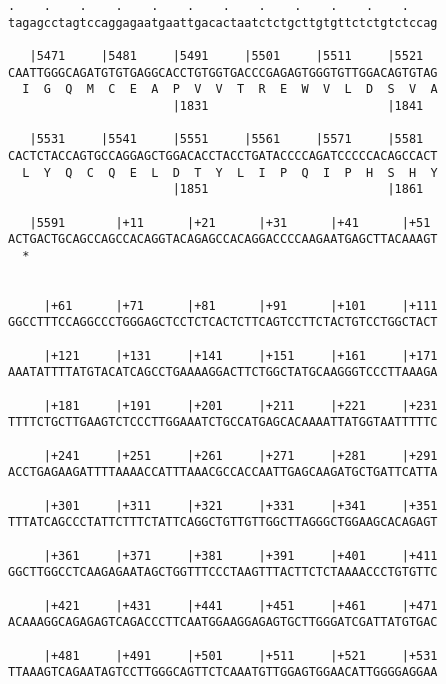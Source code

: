 \documentclass{article}
\begin{document}
\begin{Verbatim}
.    .    .    .    .    .    .    .    .    .    .    .    
tagagcctagtccaggagaatgaattgacactaatctctgcttgtgttctctgtctccag
                                                            
   |5471     |5481     |5491     |5501     |5511     |5521  
CAATTGGGCAGATGTGTGAGGCACCTGTGGTGACCCGAGAGTGGGTGTTGGACAGTGTAG
  I  G  Q  M  C  E  A  P  V  V  T  R  E  W  V  L  D  S  V  A
                       |1831                         |1841  
  
   |5531     |5541     |5551     |5561     |5571     |5581  
CACTCTACCAGTGCCAGGAGCTGGACACCTACCTGATACCCCAGATCCCCCACAGCCACT
  L  Y  Q  C  Q  E  L  D  T  Y  L  I  P  Q  I  P  H  S  H  Y
                       |1851                         |1861  
  
   |5591       |+11      |+21      |+31      |+41      |+51 
ACTGACTGCAGCCAGCCACAGGTACAGAGCCACAGGACCCCAAGAATGAGCTTACAAAGT
  *   
                                                            
  
     |+61      |+71      |+81      |+91      |+101     |+111
GGCCTTTCCAGGCCCTGGGAGCTCCTCTCACTCTTCAGTCCTTCTACTGTCCTGGCTACT
                                                            
     |+121     |+131     |+141     |+151     |+161     |+171
AAATATTTTATGTACATCAGCCTGAAAAGGACTTCTGGCTATGCAAGGGTCCCTTAAAGA
                                                            
     |+181     |+191     |+201     |+211     |+221     |+231
TTTTCTGCTTGAAGTCTCCCTTGGAAATCTGCCATGAGCACAAAATTATGGTAATTTTTC
                                                            
     |+241     |+251     |+261     |+271     |+281     |+291
ACCTGAGAAGATTTTAAAACCATTTAAACGCCACCAATTGAGCAAGATGCTGATTCATTA
                                                            
     |+301     |+311     |+321     |+331     |+341     |+351
TTTATCAGCCCTATTCTTTCTATTCAGGCTGTTGTTGGCTTAGGGCTGGAAGCACAGAGT
                                                            
     |+361     |+371     |+381     |+391     |+401     |+411
GGCTTGGCCTCAAGAGAATAGCTGGTTTCCCTAAGTTTACTTCTCTAAAACCCTGTGTTC
                                                            
     |+421     |+431     |+441     |+451     |+461     |+471
ACAAAGGCAGAGAGTCAGACCCTTCAATGGAAGGAGAGTGCTTGGGATCGATTATGTGAC
                                                            
     |+481     |+491     |+501     |+511     |+521     |+531
TTAAAGTCAGAATAGTCCTTGGGCAGTTCTCAAATGTTGGAGTGGAACATTGGGGAGGAA
                                                            

\end{Verbatim}
\end{document}
